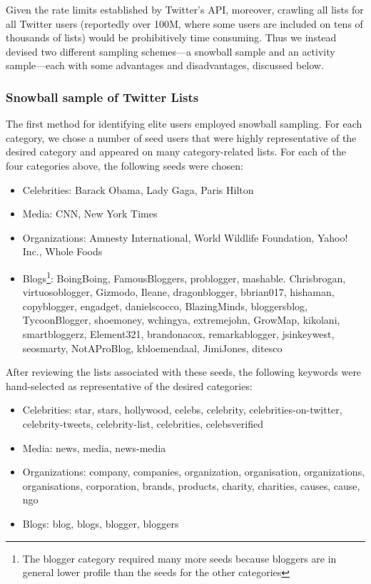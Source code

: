 \documentclass[phd,tocprelim]{cornell}
\begin{document}

Given the rate limits established by Twitter's API, moreover, crawling all
lists for all Twitter users (reportedly over 100M, where some users are
included on tens of thousands of lists) would be prohibitively time
consuming. Thus we instead devised two different sampling schemes---a
snowball sample and an activity sample---each with some advantages and
disadvantages, discussed below.


\subsubsection{Snowball sample of Twitter Lists}
The first method for identifying elite users employed snowball sampling.
For each category, we chose a number of seed users that were highly
representative of the desired category and appeared on many
category-related lists. For each of the four categories above, the
following seeds were chosen:
\begin{itemize}
	\item Celebrities: Barack Obama, Lady Gaga, Paris Hilton
	\item Media: CNN, New York Times
	\item Organizations: Amnesty International, World Wildlife
          Foundation, Yahoo! Inc., Whole Foods
	\item Blogs\footnote{The blogger category required many more seeds
          because bloggers are in general lower profile than the seeds for
          the other categories}: BoingBoing, FamousBloggers, problogger,
          mashable. Chrisbrogan, virtuosoblogger, Gizmodo, Ileane,
          dragonblogger, bbrian017, hishaman, copyblogger, engadget,
          danielscocco, BlazingMinds, bloggersblog, TycoonBlogger,
          shoemoney, wchingya, extremejohn, GrowMap, kikolani,
          smartbloggerz, Element321, brandonacox, remarkablogger,
          jsinkeywest, seosmarty, NotAProBlog, kbloemendaal, JimiJones,
          ditesco
\end{itemize}

After reviewing the lists associated with these seeds, the following
keywords were hand-selected as representative of the desired categories:
\begin{itemize}
	\item Celebrities: star, stars, hollywood, celebs, celebrity,
          celebrities-on-twitter, celebrity-tweets, celebrity-list,
          celebrities, celebsverified
	\item Media: news, media, news-media %
	\item Organizations: company, companies, organization,
          organisation, organizations, organisations, corporation,
          brands, products, charity, charities, causes, cause, ngo
	\item Blogs: blog, blogs, blogger, bloggers
\end{itemize}
\end{document}
